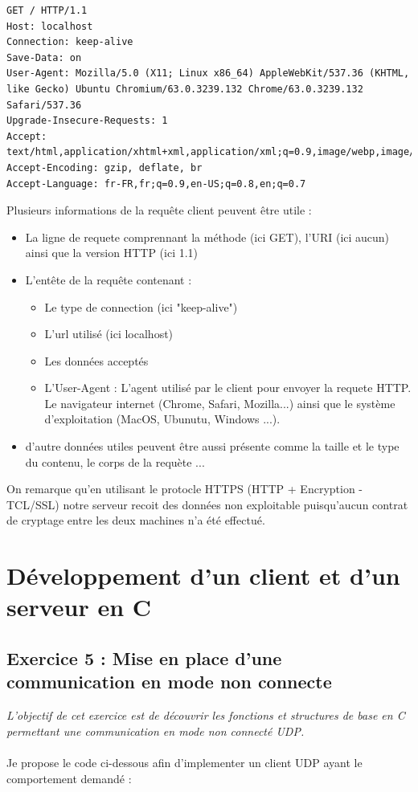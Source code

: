 \begin{verbatim}
GET / HTTP/1.1
Host: localhost
Connection: keep-alive
Save-Data: on
User-Agent: Mozilla/5.0 (X11; Linux x86_64) AppleWebKit/537.36 (KHTML, like Gecko) Ubuntu Chromium/63.0.3239.132 Chrome/63.0.3239.132 Safari/537.36
Upgrade-Insecure-Requests: 1
Accept: text/html,application/xhtml+xml,application/xml;q=0.9,image/webp,image/apng,*/*;q=0.8
Accept-Encoding: gzip, deflate, br
Accept-Language: fr-FR,fr;q=0.9,en-US;q=0.8,en;q=0.7
\end{verbatim}

Plusieurs informations de la requête client peuvent être utile :
\begin{itemize}
  \item La ligne de requete comprennant la méthode (ici GET), l'URI (ici aucun) ainsi que la version HTTP (ici 1.1)
  \item L'entête de la requête contenant :
  \begin{itemize}
    \item Le type de connection (ici "keep-alive")
    \item L'url utilisé (ici localhost)
    \item Les données acceptés
    \item L'User-Agent : L'agent utilisé par le client pour envoyer la requete HTTP. Le navigateur internet (Chrome, Safari, Mozilla...) ainsi que le système d'exploitation (MacOS, Ubunutu, Windows ...).
  \end{itemize}
  \item d'autre données utiles peuvent être aussi présente comme la taille et le type du contenu, le corps de la requète ...
\end{itemize}

On remarque qu'en utilisant le protocle HTTPS (HTTP + Encryption -TCL/SSL) notre serveur recoit des données non exploitable puisqu'aucun contrat de cryptage entre les deux machines n'a été effectué.

\section{Développement d’un client et d’un serveur en C}
\subsection{Exercice 5 : Mise en place d’une communication en mode non connecte}
\textit{L’objectif de cet exercice est de découvrir les fonctions et structures de base en C permettant une communication en mode non connecté UDP.}
\\\\
Je propose le code ci-dessous afin d'implementer un client UDP ayant le comportement demandé :
\inputminted[linenos,firstline=30,lastline=91]{cpp}{../sources/cpp/TP7-8/clientUDP.c}

